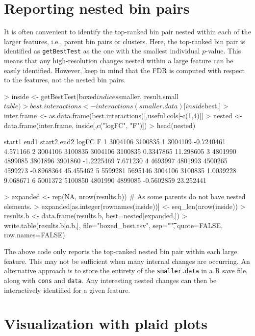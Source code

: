 \documentclass[12pt]{report}
\renewenvironment{Schunk}{\vspace{0pt}}{\vspace{0pt}}
\newcommand{\code}[1]{{\small\texttt{#1}}}
\newcommand{\R}{\textsf{R}}
\begin{document}
\section{Reporting nested bin pairs}
\label{sec:nesting}
It is often convenient to identify the top-ranked bin pair nested within each of the larger features, i.e., parent bin pairs or clusters.
Here, the top-ranked bin pair is identified as \code{getBestTest} as the one with the smallest individual $p$-value.
This means that any high-resolution changes nested within a large feature can be easily identified.
However, keep in mind that the FDR is computed with respect to the features, not the nested bin pairs.

\begin{Schunk}
\begin{Sinput}
> inside <- getBestTest(boxed$indices$smaller, result.small$table)
> best.interactions <- interactions(smaller.data)[inside$best,]
> inter.frame <- as.data.frame(best.interactions)[,useful.cols[-c(1,4)]]
> nested <- data.frame(inter.frame, inside[,c("logFC", "F")])
> head(nested)
\end{Sinput}
\begin{Soutput}
   start1    end1  start2    end2      logFC         F
1 3004106 3100835       1 3004109 -0.7240461  4.571166
2 3004106 3100835 3004106 3100835  0.3347865 11.298605
3 4801990 4899085 3801896 3901860 -1.2225469  7.671230
4 4693997 4801993 4500265 4599273 -0.8968364 45.455462
5 5599281 5695146 3004106 3100835  1.0039228  9.068671
6 5001372 5100850 4801990 4899085 -0.5602859 23.252441
\end{Soutput}
\begin{Sinput}
> expanded <- rep(NA, nrow(results.b)) # As some parents do not have nested elements.
> expanded[as.integer(rownames(inside))] <- seq_len(nrow(inside))
> results.b <- data.frame(results.b, best=nested[expanded,])
> write.table(results.b[o.b,], file="boxed_best.tsv", sep="\t", quote=FALSE, row.names=FALSE)
\end{Sinput}
\end{Schunk}

The above code only reports the top-ranked nested bin pair within each large feature.
This may not be sufficient when many internal changes are occurring.
An alternative approach is to store the entirety of the \code{smaller.data} in a \R{} save file, along with \code{cons} and \code{data}.
Any interesting nested changes can then be interactively identified for a given feature.

\section{Visualization with plaid plots}
\label{chap:plaid}
\end{document}
